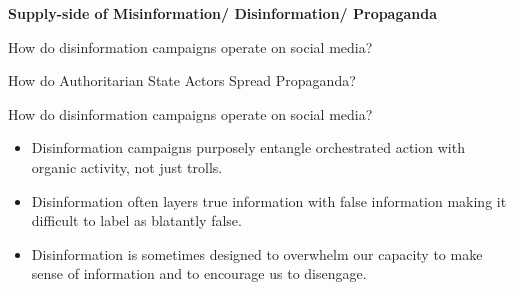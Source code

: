 \documentclass[nobackground,dvipsnames,table]{beamer}
\begin{document}
\begin{frame}{}

\begin{minipage}{0.4\textwidth}
    \raggedright\Large{\textbf{Supply-side of Misinformation/
                                Disinformation/
                                Propaganda
    }}
\end{minipage}
\hspace{0.05\textwidth}
\begin{minipage}{0.5\textwidth}

    \begin{itemize}
    \small{
        \item How do disinformation campaigns operate on social media? \newline 

        \item How do Authoritarian State Actors Spread Propaganda?


    }
    \end{itemize}
\end{minipage}

\note[]{

}
    
\end{frame}


\begin{frame}{How do disinformation campaigns operate on social media?}

\begin{itemize}
    \item Disinformation campaigns purposely entangle orchestrated action with organic activity, not just trolls.
    \item Disinformation often layers true information with false information making it difficult to label as blatantly false.
    \item Disinformation is sometimes designed to overwhelm our capacity to make sense of information and to encourage us to disengage.
\end{itemize}
    
\end{frame}
\end{document}
